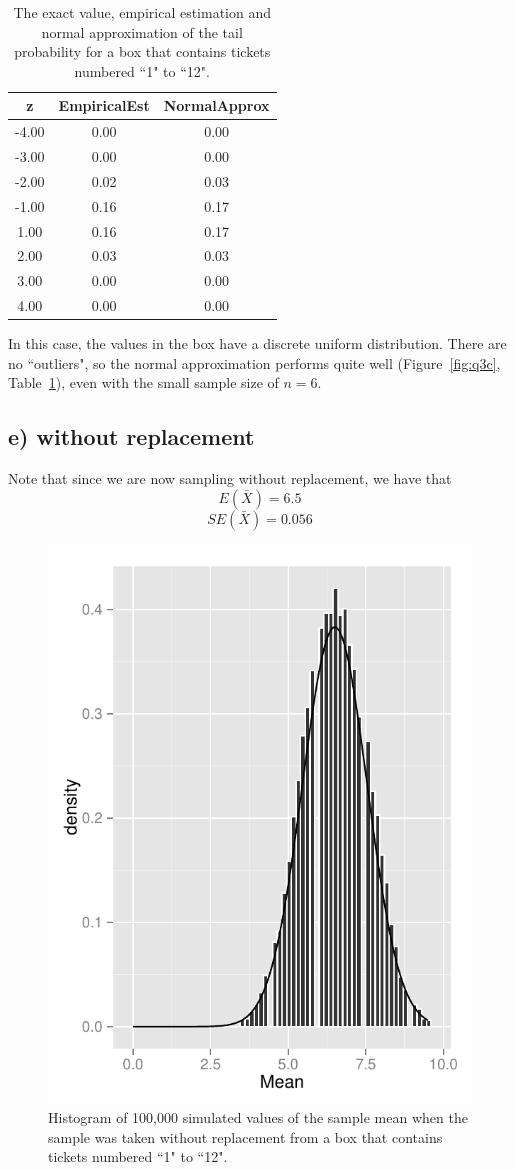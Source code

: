 \documentclass[11pt]{article}
\begin{document}
\begin{table}[H]
\centering
\begin{tabular}{|c|cc|}
  \hline
z & EmpiricalEst & NormalApprox \\ 
  \hline
-4.00 & 0.00 & 0.00 \\ 
  -3.00 & 0.00 & 0.00 \\ 
  -2.00 & 0.02 & 0.03 \\ 
  -1.00 & 0.16 & 0.17 \\ 
  1.00 & 0.16 & 0.17 \\ 
  2.00 & 0.03 & 0.03 \\ 
  3.00 & 0.00 & 0.00 \\ 
  4.00 & 0.00 & 0.00 \\ 
   \hline
\end{tabular}
\caption{The exact value, empirical estimation and normal approximation of the tail probability for a box that contains tickets numbered ``1" to ``12".} \label{tab:q3c}
\end{table}

\noindent In this case, the values in the box have a discrete uniform distribution.  There are no ``outliers", so the normal approximation performs quite well (Figure~\ref{fig:q3c}, Table~\ref{tab:q3c}), even with the small sample size of $n=6$.



\subsection*{e) without replacement}


\noindent Note that since we are now sampling without replacement, we have that
$$E(\bar{X})= 6.5$$ 
$$SE(\bar{X}) = 0.056$$


\begin{figure}[H]
\centering
\includegraphics[width = .5\textwidth]{histogram_3e-1.pdf}
\caption{Histogram of 100,000 simulated values of the sample mean when the sample was taken without replacement from a box that contains tickets numbered ``1" to ``12".}
\end{figure}
\end{document}
